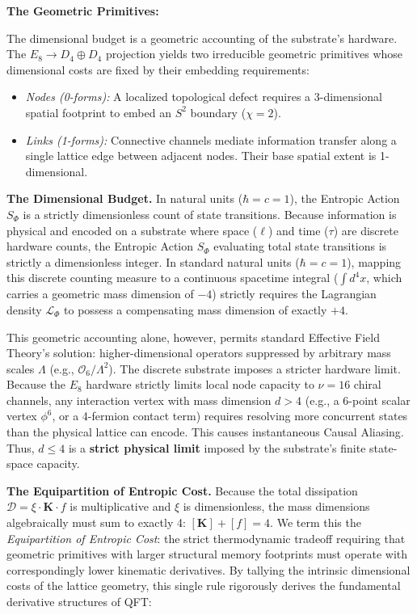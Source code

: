 \textbf{The Geometric Primitives:} 

The dimensional budget is a geometric accounting of the substrate's hardware. The $E_8 \to D_4 \oplus D_4$ projection yields two irreducible geometric primitives whose dimensional costs are fixed by their embedding requirements:

\begin{itemize}
    \item \textit{Nodes (0-forms):} A localized topological defect requires a 3-dimensional spatial footprint to embed an $S^2$ boundary ($\chi=2$).
    
    \item \textit{Links (1-forms):} Connective channels mediate information transfer along a single lattice edge between adjacent nodes. Their base spatial extent is 1-dimensional.
\end{itemize}


\textbf{The Dimensional Budget.} In natural units ($\hbar = c = 1$), the Entropic Action $S_\Phi$ is a strictly dimensionless count of state transitions. Because information is physical and encoded on a substrate where space ($\ell$) and time ($\tau$) are discrete hardware counts, the Entropic Action $S_\Phi$ evaluating total state transitions is strictly a dimensionless integer. In standard natural units ($\hbar = c = 1$), mapping this discrete counting measure to a continuous spacetime integral ($\int d^4x$, which carries a geometric mass dimension of $-4$) strictly requires the Lagrangian density $\mathcal{L}_\Phi$ to possess a compensating mass dimension of exactly $+4$.

This geometric accounting alone, however, permits standard Effective Field Theory's solution: higher-dimensional operators suppressed by arbitrary mass scales $\Lambda$ (e.g., $\mathcal{O}_6/\Lambda^2$). The discrete substrate imposes a stricter hardware limit. Because the $E_8$ hardware strictly limits local node capacity to $\nu=16$ chiral channels, any interaction vertex with mass dimension $d>4$ (e.g., a 6-point scalar vertex $\phi^6$, or a 4-fermion contact term) requires resolving more concurrent states than the physical lattice can encode. This causes instantaneous Causal Aliasing. Thus, $d \leq 4$ is a \textbf{strict physical limit} imposed by the substrate's finite state-space capacity.

\textbf{The Equipartition of Entropic Cost.}
\label{sec:equipartition}
Because the total dissipation $\mathcal{D} = \xi \cdot \mathbf{K} \cdot f$ is multiplicative and $\xi$ is dimensionless, the mass dimensions algebraically must sum to exactly 4: $[\mathbf{K}] + [f] = 4$. We term this the \emph{Equipartition of Entropic Cost}: the strict thermodynamic tradeoff requiring that geometric primitives with larger structural memory footprints must operate with correspondingly lower kinematic derivatives. By tallying the intrinsic dimensional costs of the lattice geometry, this single rule rigorously derives the fundamental derivative structures of QFT:

